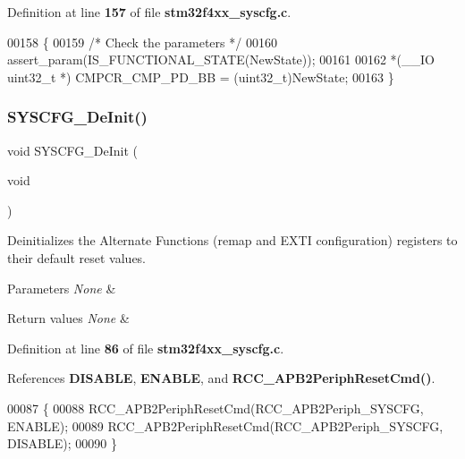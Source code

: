 Definition at line \textbf{ 157} of file \textbf{ stm32f4xx\+\_\+syscfg.\+c}.


\begin{DoxyCode}
00158 \{
00159   \textcolor{comment}{/* Check the parameters */}
00160   assert_param(IS_FUNCTIONAL_STATE(NewState));
00161 
00162   *(\_\_IO uint32\_t *) CMPCR_CMP_PD_BB = (uint32\_t)NewState;
00163 \}
\end{DoxyCode}
\mbox{\label{group__SYSCFG__Private__Functions_gaf2f9faa2df9a59a68ae17fae23bc478e}} 
\subsubsection{S\+Y\+S\+C\+F\+G\+\_\+\+De\+Init()}
{\footnotesize\ttfamily void S\+Y\+S\+C\+F\+G\+\_\+\+De\+Init (\begin{DoxyParamCaption}\item[{void}]{ }\end{DoxyParamCaption})}



Deinitializes the Alternate Functions (remap and E\+X\+TI configuration) registers to their default reset values. 


\begin{DoxyParams}{Parameters}
{\em None} & \\
\hline
\end{DoxyParams}

\begin{DoxyRetVals}{Return values}
{\em None} & \\
\hline
\end{DoxyRetVals}


Definition at line \textbf{ 86} of file \textbf{ stm32f4xx\+\_\+syscfg.\+c}.



References \textbf{ D\+I\+S\+A\+B\+LE}, \textbf{ E\+N\+A\+B\+LE}, and \textbf{ R\+C\+C\+\_\+\+A\+P\+B2\+Periph\+Reset\+Cmd()}.


\begin{DoxyCode}
00087 \{
00088    RCC_APB2PeriphResetCmd(RCC_APB2Periph_SYSCFG, ENABLE);
00089    RCC_APB2PeriphResetCmd(RCC_APB2Periph_SYSCFG, DISABLE);
00090 \}
\end{DoxyCode}
\mbox{\label{group__SYSCFG__Private__Functions_gabec494266ebbbde0279ad1d16c3065d0}} 

